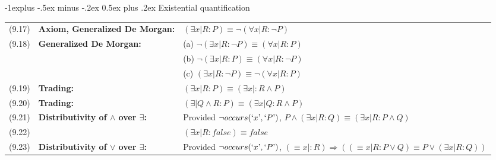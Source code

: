 \documentclass[letterpaper, 8pt]{extarticle}
\makeatletter
\renewcommand{\subsection}{\@startsection{subsection}{2}{0mm}%
                                {-1explus -.5ex minus -.2ex}%
                                {0.5ex plus .2ex}%
                                {\normalfont\small\bfseries}}
\newcommand{\To}{\Rightarrow}
\makeatother
\begin{document}
\begin{multicols*}{3}
    \subsection{Existential quantification}
    \begin{tabulary}{\linewidth}{@{}lLL@{}}
        (9.17) & \textbf{Axiom, Generalized De Morgan:}             & $(\exists x | R : P) \equiv \neg (\forall x | R : \neg P)$                                                                                                                 \\
        (9.18) & \textbf{Generalized De Morgan:}                    & (a) $\neg (\exists x | R : \neg P) \equiv (\forall x | R : P)$                                                                                                             \\
               &                                                    & (b) $\neg(\exists x | R : P) \equiv (\forall x | R : \neg P)$                                                                                                              \\
               &                                                    & (c) $(\exists x | R : \neg P) \equiv \neg(\forall x | R : P)$                                                                                                              \\
        (9.19) & \textbf{Trading:}                                  & $(\exists x | R : P) \equiv (\exists x |: R \land P)$                                                                                                                      \\
        (9.20) & \textbf{Trading:}                                  & $(\exists | Q \land R : P) \equiv (\exists x | Q : R \land P)$                                                                                                             \\
        (9.21) & \textbf{Distributivity of $\land$ over $\exists$:} & Provided $\neg occurs(`x\textrm', `P\textrm')$, $P \land (\exists x | R : Q) \equiv (\exists x | R : P \land Q)$                                                           \\
        (9.22) &                                                    & $(\exists x | R : false) \equiv false$                                                                                                                                     \\
        (9.23) & \textbf{Distributivity of $\lor$ over $\exists$:}  & Provided $\neg occurs(`x\textrm', `P\textrm')$, $(\equiv x |: R) \To ((\equiv x | R : P \lor Q) \equiv P \lor (\exists x | R : Q))$                                        \\

\end{tabulary}
\end{multicols*}
\end{document}
